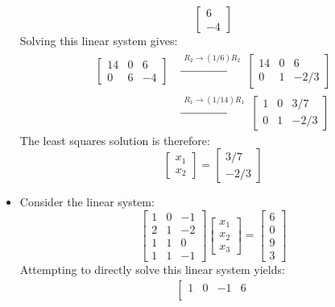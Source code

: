 \documentclass{article}
\begin{document}
\begin{itemize}
\[\begin{bmatrix}
6 \\ -4
\end{bmatrix}\]
Solving this linear system gives:
\begin{align*}
\left[\begin{array}{cc|c}
14 & 0 &   6 \\ 
  0 & 6 & -4
\end{array}\right] 
& \xrightarrow{\begin{array}{c} R_2 \rightarrow (1/6)R_2 \end{array}}  
\left[\begin{array}{cc|c}
14 & 0 &      6 \\ 
  0 & 1 & -2/3
\end{array}\right] \\ 
& \xrightarrow{\begin{array}{c} R_1 \rightarrow (1/14)R_1 \end{array}}  
\left[\begin{array}{cc|c}
1 & 0 &  3/7 \\ 
0 & 1 & -2/3
\end{array}\right]
\end{align*}
The least squares solution is therefore:
\[\begin{bmatrix} 
x_1 \\ x_2 
\end{bmatrix} = \begin{bmatrix}
3/7 \\ -2/3  
\end{bmatrix}\]
\item Consider the linear system:
\[\begin{bmatrix}
1 & 0 & -1 \\ 
2 & 1 & -2 \\ 
1 & 1 &  0 \\ 
1 & 1 & -1 
\end{bmatrix}\begin{bmatrix}
x_1 \\ x_2 \\ x_3
\end{bmatrix} = \begin{bmatrix}
6 \\ 0 \\ 9 \\ 3 
\end{bmatrix}\]
Attempting to directly solve this linear system yields:
\begin{align*}
\left[\begin{array}{ccc|c}
1 & 0 & -1 & 6 \\ 

\end{array}
\end{align*}
\end{itemize}
\end{document}
